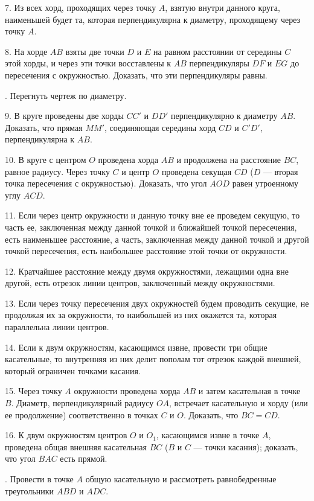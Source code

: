 \documentclass[oneside]{book}
\begin{document}

7.
Из всех хорд, проходящих через точку $A$, взятую внутри данного круга, наименьшей будет та, которая перпендикулярна к диаметру, проходящему через точку $A$.

8.
На хорде $AB$ взяты две точки $D$ и $E$ на равном расстоянии от середины $C$ этой хорды, и через эти точки восставлены к $AB$ перпендикуляры $DF$ и $EG$ до пересечения с окружностью.
Доказать, что эти перпендикуляры равны.

.
Перегнуть чертеж по диаметру.

9.
В круге проведены две хорды $CC'$ и $DD'$ перпендикулярно к диаметру $AB$.
Доказать, что прямая $MM'$, соединяющая середины хорд $CD$ и $C'D'$, перпендикулярна к $AB$.

10.
В круге с центром $O$ проведена хорда $AB$ и продолжена на расстояние $BC$, равное радиусу.
Через точку $C$ и центр $O$ проведена секущая $CD$ ($D$ — вторая точка пересечения с окружностью).
Доказать, что угол $AOD$ равен утроенному углу $ACD$.

11.
Если через центр окружности и данную точку вне ее проведем секущую, то часть ее, заключенная между данной точкой и ближайшей точкой пересечения, есть наименьшее расстояние, а часть, заключенная между данной точкой и другой точкой пересечения, есть наибольшее расстояние этой точки от окружности.

12.
Кратчайшее расстояние между двумя окружностями, лежащими одна вне другой, есть отрезок линии центров, заключенный между окружностями.

13.
Если через точку пересечения двух окружностей будем проводить секущие, не продолжая их за окружности, то наибольшей из них окажется та, которая параллельна линии центров.

14.
Если к двум окружностям, касающимся извне, провести три общие касательные, то внутренняя из них делит пополам тот отрезок каждой внешней, который ограничен точками касания.

15.
Через точку $A$ окружности проведена хорда $AB$ и затем касательная в точке $B$.
Диаметр, перпендикулярный радиусу $OA$, встречает касательную и хорду (или ее продолжение) соответственно в точках $C$ и $O$.
Доказать, что $BC=CD$.

16.
К двум окружностям центров $O$ и $O_1$, касающимся извне в точке $A$, проведена общая внешняя касательная $BC$ ($B$ и $C$ — точки касания);
доказать, что угол $BAC$ есть прямой.

.
Провести в точке $A$ общую касательную и рассмотреть равнобедренные треугольники $ABD$ и $ADC$.
\end{document}
